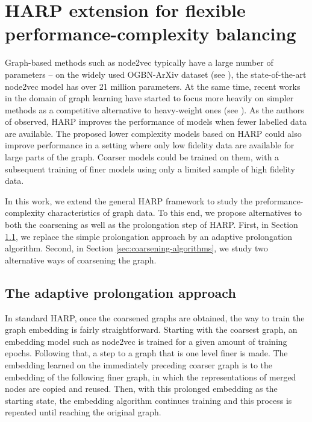 \section{HARP extension for flexible performance-complexity balancing}\label{sec:our-method}

Graph-based methods such as node2vec typically have a large number of parameters -- on the widely used OGBN-ArXiv dataset (see \cite{hu_open_2021}), the state-of-the-art node2vec model has over 21 million parameters. At the same time, recent works in the domain of graph learning have started to focus more heavily on simpler methods as a competitive alternative to heavy-weight ones (see \cite{frasca_sign_2020, huang_combining_2020}). As the authors of \cite{chen_harp_2018} observed, HARP improves the performance of models when fewer labelled data are available. The proposed lower complexity models based on HARP could also improve performance in a setting where only low fidelity data are available for large parts of the graph. Coarser models could be trained on them, with a subsequent training of finer models using only a limited sample of high fidelity data.

In this work, we extend the general HARP framework to study the preformance-complexity characteristics of graph data. To this end, we propose alternatives to both the coarsening as well as the prolongation step of HARP. First, in Section \ref{sec:adaptive-prolongation}, we replace the simple prolongation approach by an adaptive prolongation algorithm. Second, in Section \ref{sec:coarsening-algorithms}, we study two alternative ways of coarsening the graph.

\subsection{The adaptive prolongation approach}\label{sec:adaptive-prolongation}

In standard HARP, once the coarsened graphs are obtained, the way to train the graph embedding is fairly straightforward. Starting with the coarsest graph, an embedding model such as node2vec is trained for a given amount of training epochs. Following that, a step to a graph that is one level finer is made. The embedding learned on the immediately preceding coarser graph is  to the embedding of the following finer graph, in which the representations of merged nodes are copied and reused.
 Then, with this prolonged embedding as the starting state, the embedding algorithm continues training and this process is repeated until reaching the original graph.

